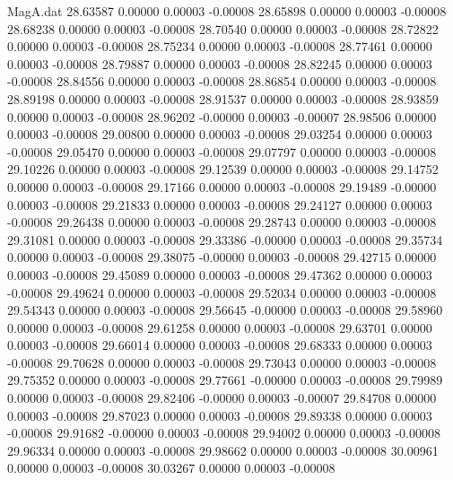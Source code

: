 \begin{filecontents}{MagA.dat}
  28.63587    0.00000    0.00003   -0.00008
  28.65898    0.00000    0.00003   -0.00008
  28.68238    0.00000    0.00003   -0.00008
  28.70540    0.00000    0.00003   -0.00008
  28.72822    0.00000    0.00003   -0.00008
  28.75234    0.00000    0.00003   -0.00008
  28.77461    0.00000    0.00003   -0.00008
  28.79887    0.00000    0.00003   -0.00008
  28.82245    0.00000    0.00003   -0.00008
  28.84556    0.00000    0.00003   -0.00008
  28.86854    0.00000    0.00003   -0.00008
  28.89198    0.00000    0.00003   -0.00008
  28.91537    0.00000    0.00003   -0.00008
  28.93859    0.00000    0.00003   -0.00008
  28.96202   -0.00000    0.00003   -0.00007
  28.98506    0.00000    0.00003   -0.00008
  29.00800    0.00000    0.00003   -0.00008
  29.03254    0.00000    0.00003   -0.00008
  29.05470    0.00000    0.00003   -0.00008
  29.07797    0.00000    0.00003   -0.00008
  29.10226    0.00000    0.00003   -0.00008
  29.12539    0.00000    0.00003   -0.00008
  29.14752    0.00000    0.00003   -0.00008
  29.17166    0.00000    0.00003   -0.00008
  29.19489   -0.00000    0.00003   -0.00008
  29.21833    0.00000    0.00003   -0.00008
  29.24127    0.00000    0.00003   -0.00008
  29.26438    0.00000    0.00003   -0.00008
  29.28743    0.00000    0.00003   -0.00008
  29.31081    0.00000    0.00003   -0.00008
  29.33386   -0.00000    0.00003   -0.00008
  29.35734    0.00000    0.00003   -0.00008
  29.38075   -0.00000    0.00003   -0.00008
  29.42715    0.00000    0.00003   -0.00008
  29.45089    0.00000    0.00003   -0.00008
  29.47362    0.00000    0.00003   -0.00008
  29.49624    0.00000    0.00003   -0.00008
  29.52034    0.00000    0.00003   -0.00008
  29.54343    0.00000    0.00003   -0.00008
  29.56645   -0.00000    0.00003   -0.00008
  29.58960    0.00000    0.00003   -0.00008
  29.61258    0.00000    0.00003   -0.00008
  29.63701    0.00000    0.00003   -0.00008
  29.66014    0.00000    0.00003   -0.00008
  29.68333    0.00000    0.00003   -0.00008
  29.70628    0.00000    0.00003   -0.00008
  29.73043    0.00000    0.00003   -0.00008
  29.75352    0.00000    0.00003   -0.00008
  29.77661   -0.00000    0.00003   -0.00008
  29.79989    0.00000    0.00003   -0.00008
  29.82406   -0.00000    0.00003   -0.00007
  29.84708    0.00000    0.00003   -0.00008
  29.87023    0.00000    0.00003   -0.00008
  29.89338    0.00000    0.00003   -0.00008
  29.91682   -0.00000    0.00003   -0.00008
  29.94002    0.00000    0.00003   -0.00008
  29.96334    0.00000    0.00003   -0.00008
  29.98662    0.00000    0.00003   -0.00008
  30.00961    0.00000    0.00003   -0.00008
  30.03267    0.00000    0.00003   -0.00008

\end{filecontents}
